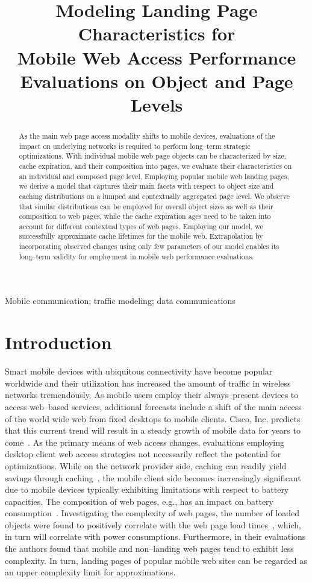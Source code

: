 \documentclass[letterpaper,conference]{IEEEtran}
\title{Modeling Landing Page Characteristics for \\Mobile Web  Access Performance Evaluations on Object and Page Levels}
\author{\IEEEauthorblockN{Troy Johnson}
	\IEEEauthorblockA{Dept. of Computer Science\\
		Central Michigan University\\
		Mount Pleasant, MI 48859\\
		Email: johns4ta@cmich.edu}
	\and
	\IEEEauthorblockN{Patrick Seeling}
	\IEEEauthorblockA{Dept. of Computer Science\\
		Central Michigan University\\
		Mount Pleasant, MI 48859\\
		Email: pseeling@ieee.org}
}
\begin{document}
\maketitle

\begin{abstract}
As the main web page access modality shifts to mobile devices, evaluations of the impact on underlying networks is required to perform long--term strategic optimizations.
With individual mobile web page objects can be characterized by size, cache expiration, and their composition into pages, we evaluate their characteristics on an individual and composed page level.
Employing popular mobile web landing pages, we derive a model that captures their main facets with respect to object size and caching distributions on a lumped and contextually aggregated page level.
We observe that similar distributions can be employed for overall object sizes as well as their composition to web pages, while the cache expiration ages need to be taken into account for different contextual types of web pages.
Employing our model, we successfully approximate cache lifetimes for the mobile web.
Extrapolation by incorporating observed changes using only few parameters of our model enables its long--term validity for employment in mobile web performance evaluations.
\end{abstract}

\begin{IEEEkeywords}
	Mobile communication; traffic modeling; data communications
\end{IEEEkeywords}

\section{Introduction}

Smart mobile devices with ubiquitous connectivity have become popular worldwide and their utilization has increased the amount of traffic in wireless networks tremendously. 
As mobile users employ their always--present devices to access web--based services, additional forecasts include a shift of the main access of the world wide web from fixed desktops to mobile clients. 
Cisco, Inc. predicts that this current trend will result in a steady growth of mobile data for years to come~\cite{VNI14}.
As the primary means of web access changes, evaluations employing desktop client web access strategies not necessarily reflect the potential for optimizations.
While on the network provider side, caching can readily yield savings through caching~\cite{IhPa11}, the mobile client side becomes increasingly significant due to mobile devices typically exhibiting limitations with respect to battery capacities.
The composition of web pages, e.g., has an impact on battery consumption~\cite{ThAgNiBoSi12}.
Investigating the complexity of web pages, the number of loaded objects were found to positively correlate with the web page load times~\cite{BuMaSe13}, which, in turn will correlate with power consumptions.
Furthermore, in their evaluations the authors found that mobile and non--landing web pages tend to exhibit less complexity. 
In turn, landing pages of popular mobile web sites can be regarded as an upper complexity limit for approximations.
\end{document}
